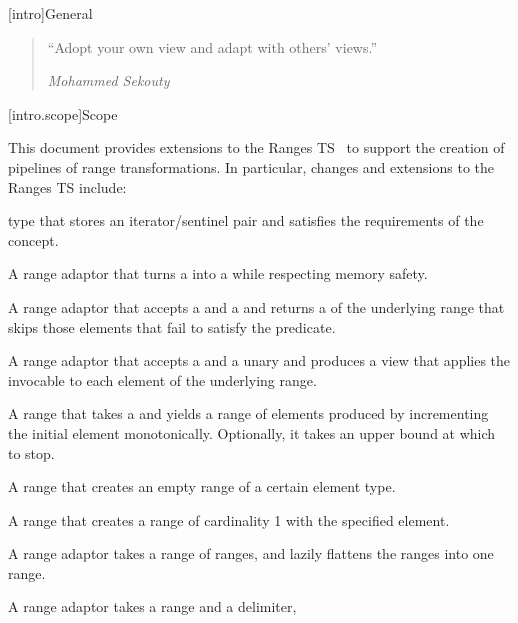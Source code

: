 [intro]{General}

\begin{quote}
``Adopt your own view and adapt with others' views.''
\begin{flushright}
\textemdash \textit{Mohammed Sekouty}
\end{flushright}
\end{quote}

[intro.scope]{Scope}

\pnum
This document provides extensions to the Ranges TS~\cite{ranges-ts} to
support the creation of pipelines of range transformations. In particular,
changes and extensions to the Ranges TS include:

\begin{itemize}
\item {} type that stores an
iterator/sentinel pair and satisfies the requirements of the  concept.
{\color{remclr}
\item {}}
\item A  range adaptor that turns a  into a
 while respecting memory safety.
\item A  range adaptor that accepts a  and a
 and returns a  of the underlying range that skips
those elements that fail to satisfy the predicate.
\item A  range adaptor that accepts a  and a
unary  and produces a view that applies the invocable to each
element of the underlying range.
\item A  range that takes a  and
yields a range of elements produced by incrementing the initial element
monotonically. Optionally, it takes an upper bound at which to stop.
\item A  range that creates an empty range of a certain
element type.
\item A  range that creates a range of cardinality 1 with
the specified element.
\item A  range adaptor takes a range of ranges,
and lazily flattens the ranges into one range.
\item A  range adaptor takes a range and a delimiter,

\end{itemize}
